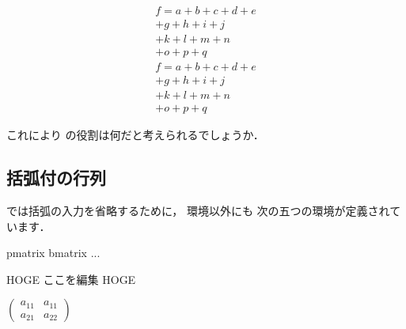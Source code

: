 \begin{inout}
\setlength\multlinegap{10pt}
\begin{multline}
 f = a + b + c + d + e \\
   + g + h + i + j \\
   + k + l + m + n \\
   + o + p + q 
\end{multline} 
\setlength\multlinegap{30pt}
\begin{multline}
 f = a + b + c + d + e \\
   + g + h + i + j \\
   + k + l + m + n \\
   + o + p + q 
\end{multline}

これにより の役割は何だと考えられるでしょうか．

\subsection{括弧付の行列}

\AmSLaTeX では括弧の入力を省略するために， 環境以外にも
次の五つの環境が定義されています．
\begin{usage}
 pmatrix
 bmatrix 
 ...
\end{usage}
HOGE ここを編集
HOGE

\begin{inout}
 \begin{math}
  \begin{pmatrix}
   a_{11} & a_{11} \\
   a_{21} & a_{22} 
  \end{pmatrix}
 \end{math}
\end{inout}


\end{inout}
